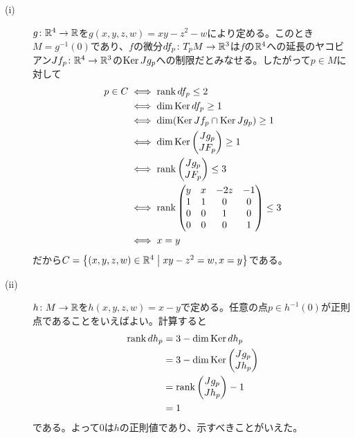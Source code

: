 \subsubsection{} %
\begin{sol} ${}$
  \begin{description}
    \item[(i)] $g \colon {\mathbb R}^4 \to {\mathbb R}$を$g(x,y,z,w) = xy - z^2 -w$により定める。このとき$M = g^{-1}(0)$であり、$f$の微分$df_p \colon T_p M \to {\mathbb R}^3$は$f$の${\mathbb R}^4$への延長のヤコビアン$Jf_p \colon {\mathbb R}^4 \to {\mathbb R}^3$の$\operatorname{Ker} Jg_p$への制限だとみなせる。したがって$p \in M$に対して
    \begin{align*}
      p \in C &\iff \operatorname{rank} df_p \leq 2 \\
      &\iff \dim \operatorname{Ker} df_p \geq 1 \\
      &\iff \dim (\operatorname{Ker} Jf_p \cap \operatorname{Ker} Jg_p) \geq 1 \\
      & \iff \dim \operatorname{Ker} \begin{pmatrix}  Jg_p \\ JF_p \end{pmatrix} \geq 1 \\
      &\iff \operatorname{rank} \begin{pmatrix}  Jg_p \\ JF_p \end{pmatrix} \leq 3 \\
      &\iff \operatorname{rank} \begin{pmatrix}  y &x& -2z& -1 \\ 1& 1& 0& 0 \\ 0& 0& 1& 0 \\ 0& 0& 0& 1 \end{pmatrix} \leq 3 \\
      &\iff x=y
    \end{align*}
    だから$C =\left\{ (x,y,z,w) \in {\mathbb R}^4 \mathrel{} \middle| \mathrel{} xy-z^2 = w, x=y \right\}$である。
    \item[(ii)] $h \colon M \to {\mathbb R}$を$h(x,y,z,w ) = x-y$で定める。任意の点$p \in h^{-1}(0)$が正則点であることをいえばよい。計算すると
    \begin{align*}
      \operatorname{rank} dh_p &= 3 - \dim \operatorname{Ker} dh_p \\
      &= 3- \dim \operatorname{Ker} \begin{pmatrix} Jg_p \\ Jh_p \end{pmatrix} \\
      &= \operatorname{rank} \begin{pmatrix} Jg_p \\ Jh_p \end{pmatrix} - 1 \\
      &= 1
    \end{align*}
    である。よって$0$は$h$の正則値であり、示すべきことがいえた。
  \end{description}
\end{sol}


